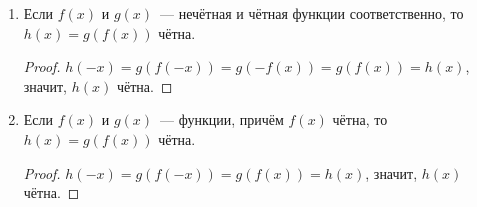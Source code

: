 \begin{enumerate}
	\item Если $f(x)$ и $g(x)$~--- нечётная и чётная функции соответственно, то $h(x) = g(f(x))$ чётна.
	\begin{proof}
	$h(-x) = g(f(-x)) = g(-f(x)) = g(f(x)) = h(x)$, значит, $h(x)$ чётна.
	\end{proof}
	
	\item Если $f(x)$ и $g(x)$~--- функции, причём $f(x)$ чётна, то $h(x) = g(f(x))$ чётна.
	\begin{proof}
	$h(-x) = g(f(-x)) = g(f(x)) = h(x)$, значит, $h(x)$ чётна.
	\end{proof}
\end{enumerate}